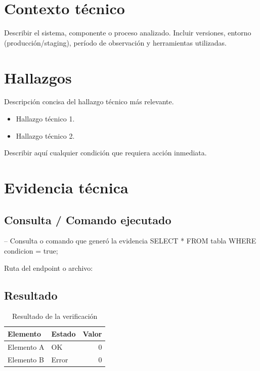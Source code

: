 \documentclass{../base/canon}
\begin{document}
\section{Contexto técnico}

\begin{ParrafoMetodologico}
Describir el sistema, componente o proceso analizado. Incluir versiones, entorno
(producción/staging), período de observación y herramientas utilizadas.
\end{ParrafoMetodologico}

\section{Hallazgos}

\begin{KeyFindingBox}
  Descripción concisa del hallazgo técnico más relevante.
\end{KeyFindingBox}

\begin{itemize}
  \item Hallazgo técnico 1.
  \item Hallazgo técnico 2.
\end{itemize}

\begin{WarningBox}
  Describir aquí cualquier condición que requiera acción inmediata.
\end{WarningBox}

\section{Evidencia técnica}

\subsection{Consulta / Comando ejecutado}

\begin{CodeBlock}
-- Consulta o comando que generó la evidencia
SELECT * FROM tabla WHERE condicion = true;
\end{CodeBlock}

Ruta del endpoint o archivo: 

\subsection{Resultado}

\begin{table}[H]
  \centering
  \caption{Resultado de la verificación}
  \begin{tabular}{l l r}
    \toprule
    \textbf{Elemento} & \textbf{Estado} & \textbf{Valor} \\
    \midrule
    Elemento A & OK    & 0 \\
    Elemento B & Error & 0 \\
    \bottomrule
  \end{tabular}
\end{table}
\end{document}
